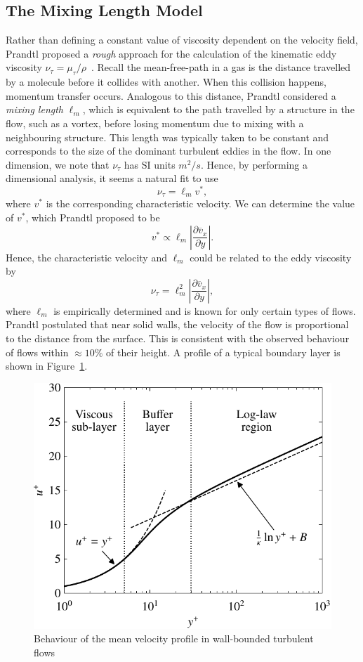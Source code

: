 \subsection{The Mixing Length Model}
Rather than defining a constant value of viscosity dependent on the velocity field, Prandtl proposed a \textit{rough} approach for the calculation of the kinematic eddy viscosity $\nu_\tau=\mu_\tau/\rho$~\cite{prandtlBerichtUberUntersuchungen1925}. Recall the mean-free-path in a gas is the distance travelled by a molecule before it collides with another. When this collision happens, momentum transfer occurs. Analogous to this distance, Prandtl considered a \textit{mixing length} $\ell_m$, which is equivalent to the path travelled by a structure in the flow, such as a vortex, before losing momentum due to mixing with a neighbouring structure. This length was typically taken to be constant and corresponds to the size of the dominant turbulent eddies in the flow. In one dimension, we note that $\nu_\tau$ has SI units $m^2/s$. Hence, by performing a dimensional analysis, it seems a natural fit to use
\begin{equation}
	\nu_\tau = \ell_m v^*,
\end{equation}
where $v^*$ is the corresponding characteristic velocity. We can determine the value of $v^*$, which Prandtl proposed to be
\begin{equation}
	v^* \propto \ell_m \left|\frac{\partial \overline v_x}{\partial y}\right|.
\end{equation}
Hence, the characteristic velocity and $\ell_m$ could be related to the eddy viscosity by
\begin{equation}
    \nu_\tau = \ell_m^2 \left| \frac{\partial \overline v_x}{\partial y}\right|,
\end{equation}
where $\ell_m$ is empirically determined and is known for only certain types of flows. Prandtl postulated that near solid walls, the velocity of the flow is proportional to the distance from the surface. This is consistent with the observed behaviour of flows within $\approx 10\%$ of their height. A profile of a typical boundary layer is shown in Figure~\ref{fig:law_of_the_wall}. 
\begin{figure}[htbp]
	\centering
	\includegraphics[height=0.45\linewidth]{Pictures/law_of_the_wall}
	\caption{Behaviour of the mean velocity profile in wall-bounded turbulent flows}
	\label{fig:law_of_the_wall}
\end{figure}

